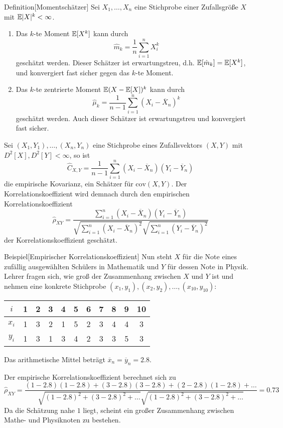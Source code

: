 \begin{colbox}{Definition}[Momentschätzer]
    Sei $X_1,\dots,X_n$ eine Stichprobe einer Zufallsgröße $X$ mit $\mathbb E|X|^k < \infty$. 
    \begin{enumerate}
        \item Das $k$-te Moment $\mathbb E[X^k]$ kann durch 
        \[
            \hat{m}_k = \dfrac{1}{n}\sum_{i=1}^{n} X_i^k
        \]
        geschätzt werden. Dieser Schätzer ist erwartungstreu, d.h. $\mathbb E[\hat{m}_k]=\mathbb E[X^k]$, und konvergiert fast sicher 
        gegen das $k$-te Moment.
        \item Das $k$-te zentrierte Moment $\mathbb E(X-\mathbb E[X])^k$ kann durch 
        \[
            \hat{\mu}_k = \dfrac{1}{n-1}\sum_{i=1}^{n}(X_i-\overline{X}_n)^k
        \]
        geschätzt werden. Auch dieser Schätzer ist erwartungstreu und konvergiert fast sicher.
    \end{enumerate}
    Sei $(X_1,Y_1), \dots, (X_n,Y_n)$ eine Stichprobe eines Zufallsvektors $(X,Y)$ mit $D^2[X],D^2[Y]<\infty$, so ist 
    \[
        \hat{C}_{X,Y} = \dfrac{1}{n-1}\sum_{i=1}^{n}(X_i-\overline{X}_n)(Y_i-\overline{Y}_n)
    \]
    die empirische Kovarianz, ein Schätzer für $\mathrm{cov}(X,Y)$. Der Korrelationskoeffizient wird demnach durch
    den empirischen Korrelationskoeffizient 
    \[
        \hat{\rho}_{XY} 
        = \dfrac{\sum_{i=1}^{n}(X_i-\overline{X}_n)(Y_i-\overline{Y}_n)}
        {\sqrt{\sum_{i=1}^{n}(X_i-\overline{X}_n)^2}\sqrt{\sum_{i=1}^{n}(Y_i-\overline{Y}_n)^2}}
    \]
    der Korrelationskoeffizient geschätzt.
\end{colbox}

\begin{colbox}{Beispiel}[Empirischer Korrelationskoeffizient]
    Nun steht $X$ für die Note eines zufällig ausgewählten Schülers in Mathematik und $Y$ für dessen Note in Physik. 
    Lehrer fragen sich, wie groß der Zusammenhang zwischen $X$ und $Y$ ist und nehmen eine 
    konkrete Stichprobe $(x_1, y_1), (x_2, y_2), \dots, (x_{10}, y_{10})$:

    \begin{center}
    \begin{tabular}{c|cccccccccc}
        $i$   & 1 & 2 & 3 & 4 & 5 & 6 & 7 & 8 & 9 & 10 \\
        \hline
        $x_i$ & 1 & 3 & 2 & 1 & 5 & 2 & 3 & 4 & 4 & 3 \\
        $y_i$ & 1 & 3 & 1 & 3 & 4 & 2 & 3 & 3 & 5 & 3 \\
    \end{tabular}
    \end{center}

    Das arithmetische Mittel beträgt $\overline{x}_n = \overline{y}_n = 2.8$.

    Der empirische Korrelationskoeffizient berechnet sich zu
    \[
        \hat{\rho}_{XY} = 
        \frac{(1-2.8)(1-2.8) + (3-2.8)(3-2.8) + (2-2.8)(1-2.8) + \dots}
        {\sqrt{(1-2.8)^2 + (3-2.8)^2 + \dots}\sqrt{(1-2.8)^2 + (3-2.8)^2 + \dots}}
        = 0.73
    \]
    Da die Schätzung nahe $1$ liegt, scheint ein großer Zusammenhang zwischen Mathe- und Physiknoten zu bestehen.
\end{colbox}

